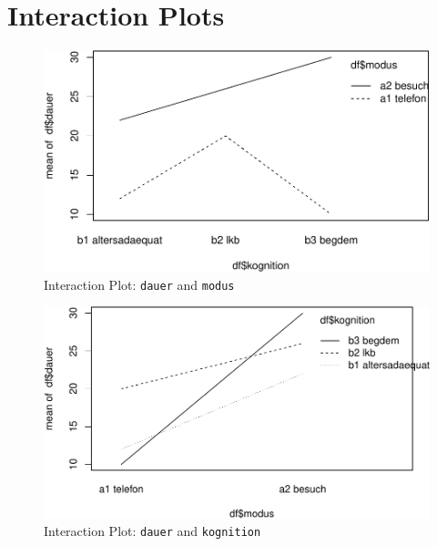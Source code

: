 \documentclass[
  doc,floatsintext]{apa6}
\begin{document}
\clearpage

\hypertarget{interaction-plots}{%
\section{Interaction Plots}\label{interaction-plots}}

\begin{figure}
\centering
\includegraphics{desc_aov_files/figure-latex/iplotdauerkog-1.pdf}
\caption{\label{fig:iplotdauerkog}Interaction Plot: \texttt{dauer} and \texttt{modus}}
\end{figure}

\begin{figure}
\centering
\includegraphics{desc_aov_files/figure-latex/iplotdauermod-1.pdf}
\caption{\label{fig:iplotdauermod}Interaction Plot: \texttt{dauer} and \texttt{kognition}}
\end{figure}
\end{document}
